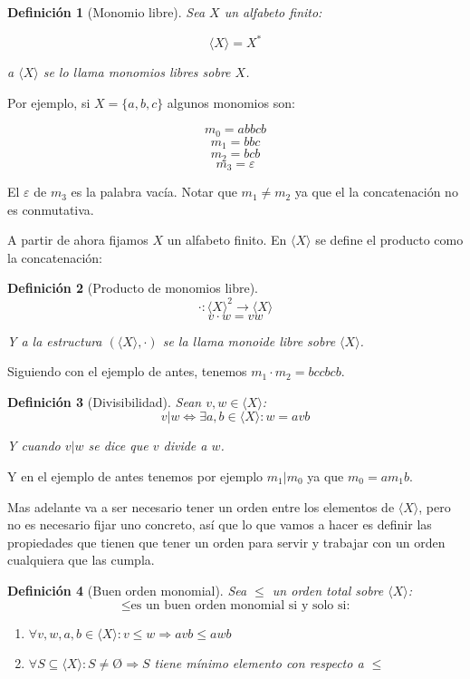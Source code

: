 \documentclass[fleqn]{amsbook} %
\theoremstyle{customstyle}
\newtheorem{definition}{Definición}[section]
\begin{document}
\begin{definition}[Monomio libre]
Sea $X$ un alfabeto finito:

\[ ⟨X⟩ = X^* \]

a $⟨X⟩$ se lo llama monomios libres sobre $X$.
\end{definition}

Por ejemplo, si $X = \{a, b, c\}$ algunos monomios son:

\[ m_0 = abbcb \]
\[ m_1 = bbc \]
\[ m_2 = bcb \]
\[ m_3 = ε \]

El $ε$ de $m_3$ es la palabra vacía. Notar que $m_1 ≠ m_2$ ya que el la concatenación no es conmutativa.

A partir de ahora fijamos $X$ un alfabeto finito. En $⟨X⟩$ se define el producto como la concatenación:

\begin{definition}[Producto de monomios libre]\
\[· : ⟨X⟩^2 → ⟨X⟩ \]
\[v · w = vw \]

Y a la estructura $(⟨X⟩, ·)$ se la llama monoide libre sobre $⟨X⟩$.
\end{definition}

Siguiendo con el ejemplo de antes, tenemos $m_1 · m_2 = bccbcb$.

\begin{definition}[Divisibilidad]
Sean $v, w ∈ ⟨X⟩$:
\[ v | w ⇔ ∃a , b ∈ ⟨X⟩ : w = avb \]

Y cuando $v | w$ se dice que $v$ divide a $w$.
\end{definition}

Y en el ejemplo de antes tenemos por ejemplo $m_1 | m_0$ ya que $m_0 = a m_1 b$.

Mas adelante va a ser necesario tener un orden entre los elementos de $⟨X⟩$, pero no es necesario fijar uno concreto, así que lo que vamos a hacer es definir las propiedades que tienen que tener un orden para servir y trabajar con un orden cualquiera que las cumpla.

\begin{definition}[Buen orden monomial]
Sea $≤$ un orden total sobre $⟨X⟩$:
\[ ≤ \text{es un buen orden monomial si y solo si:} \] %
\begin{enumerate}[label = (\alph*)]
\item $∀v, w, a, b ∈ ⟨X⟩ : v ≤ w ⇒ avb ≤ awb$

\item $∀S ⊆ ⟨X⟩ : S ≠ Ø ⇒ S$ tiene mínimo elemento con respecto a $≤$
\end{enumerate}
\end{definition}
\end{document}
